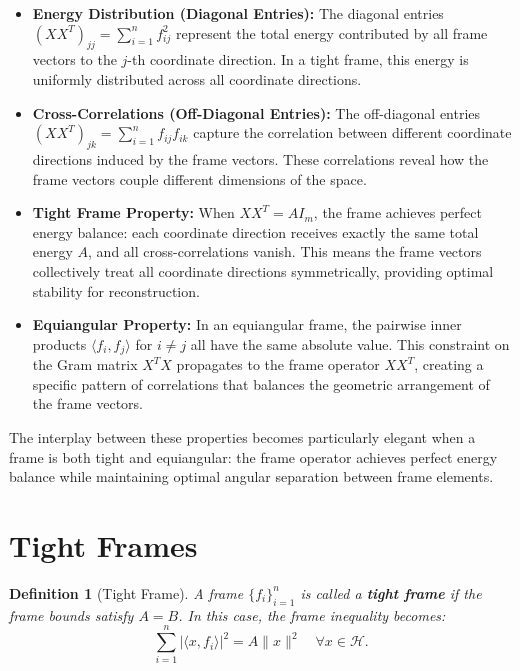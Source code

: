 \documentclass[12pt]{article}
\newtheorem{definition}{Definition}
\begin{document}
\begin{itemize}
\item \textbf{Energy Distribution (Diagonal Entries):} The diagonal entries $(XX^T)_{jj} = \sum_{i=1}^n f_{ij}^2$ represent the total energy contributed by all frame vectors to the $j$-th coordinate direction. In a tight frame, this energy is uniformly distributed across all coordinate directions.

\item \textbf{Cross-Correlations (Off-Diagonal Entries):} The off-diagonal entries $(XX^T)_{jk} = \sum_{i=1}^n f_{ij} f_{ik}$ capture the correlation between different coordinate directions induced by the frame vectors. These correlations reveal how the frame vectors couple different dimensions of the space.

\item \textbf{Tight Frame Property:} When $XX^T = AI_m$, the frame achieves perfect energy balance: each coordinate direction receives exactly the same total energy $A$, and all cross-correlations vanish. This means the frame vectors collectively treat all coordinate directions symmetrically, providing optimal stability for reconstruction.

\item \textbf{Equiangular Property:} In an equiangular frame, the pairwise inner products $\langle f_i, f_j \rangle$ for $i \neq j$ all have the same absolute value. This constraint on the Gram matrix $X^TX$ propagates to the frame operator $XX^T$, creating a specific pattern of correlations that balances the geometric arrangement of the frame vectors.
\end{itemize}

The interplay between these properties becomes particularly elegant when a frame is both tight and equiangular: the frame operator achieves perfect energy balance while maintaining optimal angular separation between frame elements.

\section{Tight Frames}

\begin{definition}[Tight Frame]
A frame $\{f_i\}_{i=1}^n$ is called a \textbf{tight frame} if the frame bounds satisfy $A = B$. In this case, the frame inequality becomes:
\[
\sum_{i=1}^n |\langle x, f_i \rangle|^2 = A \|x\|^2 \quad \forall x \in \mathcal{H}.
\]
\end{definition}
\end{document}
